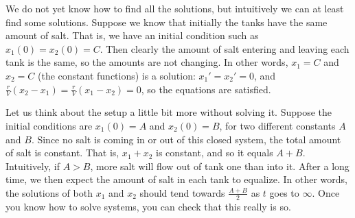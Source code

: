 \begin{example}
We do not yet know how to find all the solutions, but
intuitively we can at least find some solutions.  Suppose we
know that initially the tanks have the same amount of salt.  That is,
we have an initial condition such as $x_1(0)=x_2(0) = C$.  Then clearly the
amount of salt entering and leaving each tank is the same, so the amounts are
not changing.  In other words, $x_1 = C$ and $x_2 = C$ (the constant
functions) is a solution:  $x_1' = x_2' = 0$, and
$\frac{r}{V}(x_2-x_1) = \frac{r}{V}(x_1-x_2) = 0$, so the equations are satisfied.

Let us think about the setup a little bit more without solving it.  Suppose the
initial conditions are $x_1(0) = A$ and $x_2(0) = B$, for two different
constants $A$ and $B$.  Since no salt is coming in or out of this closed system,
the total amount of salt is constant.  That is, $x_1+x_2$ is constant,
and so it equals $A+B$.
Intuitively, if $A > B$, more salt will flow out of tank
one than into it.  After a long time, we then expect
the amount of salt in each tank to equalize. In other words,
the solutions of both $x_1$ and $x_2$ should
tend towards $\frac{A+B}{2}$ as
$t$ goes to $\infty$.
Once you know how to solve systems,
you can check
that this really is so.
\end{example}

